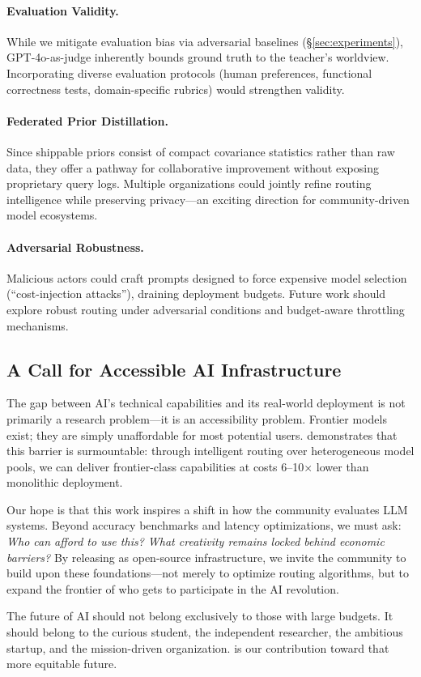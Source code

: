 \paragraph{Evaluation Validity.}
While we mitigate evaluation bias via adversarial baselines (\S\ref{sec:experiments}), GPT-4o-as-judge inherently bounds ground truth to the teacher's worldview. Incorporating diverse evaluation protocols (human preferences, functional correctness tests, domain-specific rubrics) would strengthen validity.

\paragraph{Federated Prior Distillation.}
Since shippable priors consist of compact covariance statistics rather than raw data, they offer a pathway for collaborative improvement without exposing proprietary query logs. Multiple organizations could jointly refine routing intelligence while preserving privacy---an exciting direction for community-driven model ecosystems.

\paragraph{Adversarial Robustness.}
Malicious actors could craft prompts designed to force expensive model selection (``cost-injection attacks''), draining deployment budgets. Future work should explore robust routing under adversarial conditions and budget-aware throttling mechanisms.

\subsection{A Call for Accessible AI Infrastructure}

The gap between AI's technical capabilities and its real-world deployment is not primarily a research problem---it is an accessibility problem. Frontier models exist; they are simply unaffordable for most potential users. \ours{} demonstrates that this barrier is surmountable: through intelligent routing over heterogeneous model pools, we can deliver frontier-class capabilities at costs 6--10× lower than monolithic deployment.

Our hope is that this work inspires a shift in how the community evaluates LLM systems. Beyond accuracy benchmarks and latency optimizations, we must ask: \emph{Who can afford to use this? What creativity remains locked behind economic barriers?} By releasing \ours{} as open-source infrastructure, we invite the community to build upon these foundations---not merely to optimize routing algorithms, but to expand the frontier of who gets to participate in the AI revolution.

The future of AI should not belong exclusively to those with large budgets. It should belong to the curious student, the independent researcher, the ambitious startup, and the mission-driven organization. \ours{} is our contribution toward that more equitable future.

